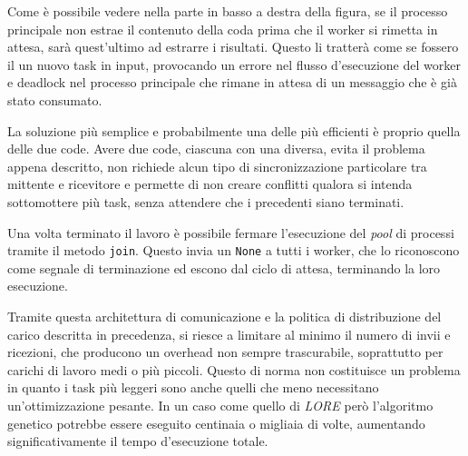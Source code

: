 Come è possibile vedere nella parte in basso a destra della figura, se il
processo principale non estrae il contenuto della coda prima che il worker si
rimetta in attesa, sarà quest'ultimo ad estrarre i risultati. Questo li tratterà
come se fossero il un nuovo task in input, provocando un errore nel flusso
d'esecuzione del worker e deadlock nel processo principale che rimane in attesa
di un messaggio che è già stato consumato.

La soluzione più semplice e probabilmente una delle più efficienti è proprio
quella delle due code. Avere due code, ciascuna con una 
diversa, evita il problema appena descritto, non richiede alcun tipo di
sincronizzazione particolare tra mittente e ricevitore e permette di non creare
conflitti qualora si intenda sottomottere più task, senza attendere che i
precedenti siano terminati.

Una volta terminato il lavoro è possibile fermare l'esecuzione del \textit{pool}
di processi tramite il metodo \verb|join|. Questo invia un \verb|None| a tutti i
worker, che lo riconoscono come segnale di terminazione ed escono dal ciclo di
attesa, terminando la loro esecuzione.

Tramite questa architettura di comunicazione e la politica di distribuzione del
carico descritta in precedenza, si riesce a limitare al minimo il numero di
invii e ricezioni, che producono un overhead non sempre trascurabile,
soprattutto per carichi di lavoro medi o più piccoli. Questo di norma non
costituisce un problema in quanto i task più leggeri sono anche quelli che meno
necessitano un'ottimizzazione pesante. In un caso come quello di \textit{LORE}
però l'algoritmo genetico potrebbe essere eseguito centinaia o migliaia di
volte, aumentando significativamente il tempo d'esecuzione totale.



